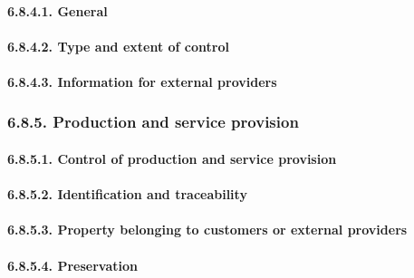 \documentclass[
]{article}
\begin{document}
\hypertarget{general-5}{%
\paragraph{6.8.4.1. General}\label{general-5}}

\hypertarget{type-and-extent-of-control}{%
\paragraph{6.8.4.2. Type and extent of
control}\label{type-and-extent-of-control}}

\hypertarget{information-for-external-providers}{%
\paragraph{6.8.4.3. Information for external
providers}\label{information-for-external-providers}}

\hypertarget{production-and-service-provision}{%
\subsubsection{6.8.5. Production and service
provision}\label{production-and-service-provision}}

\hypertarget{control-of-production-and-service-provision}{%
\paragraph{6.8.5.1. Control of production and service
provision}\label{control-of-production-and-service-provision}}

\hypertarget{identification-and-traceability}{%
\paragraph{6.8.5.2. Identification and
traceability}\label{identification-and-traceability}}

\hypertarget{property-belonging-to-customers-or-external-providers}{%
\paragraph{6.8.5.3. Property belonging to customers or external
providers}\label{property-belonging-to-customers-or-external-providers}}

\hypertarget{preservation}{%
\paragraph{6.8.5.4. Preservation}\label{preservation}}
\end{document}
